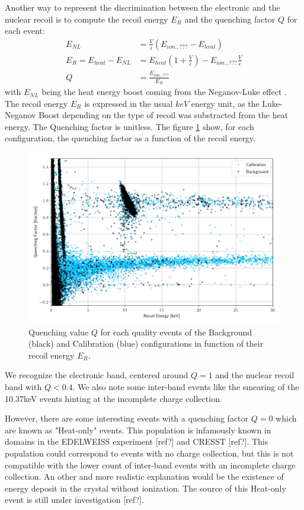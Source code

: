 Another way to represent the discrimination between the electronic and the nuclear recoil is to compute the recoil energy $E_R$ and the quenching factor $Q$ for each event:
\begin{align}
	E_{NL} &= \frac{V}{\epsilon} ( E_{ion., ???} - E_{heat} )
	\\
	E_R = E_{heat} - E_{NL} &= E_{heat} \left( 1 + \frac{V}{\epsilon} \right) - E_{ion., ???} \frac{V}{\epsilon}
	\\
	Q &= \frac{E_{ion., ???}}{E_R}
\end{align}
with $E_{NL}$ being the heat energy boost coming from the Neganov-Luke effect \cite{luke-neganov-effect}.
The recoil energy $E_R$ is expressed in the usual $keV$ energy unit, as the Luke-Neganov Boost depending on the type of recoil was substracted from the heat energy. The Quenching factor is unitless.
The figure \ref{fig:quenching_plot} show, for each configuration, the quenching factor as a function of the recoil energy.

\begin{figure}
\centering
\includegraphics[width=\linewidth,]{Figures/Neutron/quenching_plot.png}
\caption{Quenching value $Q$ for each quality events of the Background (black) and Calibration (blue) configurations in function of their recoil energy $E_R$.}
\label{fig:quenching_plot}
\end{figure}

We recognize the electronic band, centered around $Q=1$ and the nuclear recoil band with $Q<0.4$. We also note some inter-band events like the smearing of the 10.37keV events hinting at the incomplete charge collection.

However, there are some interesting events with a quenching factor $Q=0$ which are known as "Heat-only" events. This population is infamously known in domains in the EDELWEISS experiment [ref?] and CRESST [ref?]. This population could correspond to events with no charge collection, but this is not compatible with the lower count of inter-band events with an incomplete charge collection. An other and more realistic explanation would be the existence of energy deposit in the crystal without ionization. The source of this Heat-only event is still under investigation [ref?].

